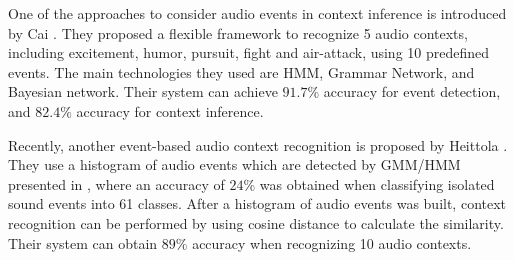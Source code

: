 One of the approaches to consider audio events in context inference is introduced by Cai \et\cite{1621215}. They proposed a flexible framework to recognize 5 audio contexts, including excitement, humor, pursuit, fight and air-attack, using 10 predefined events. The main technologies they used are HMM, Grammar Network, and Bayesian network. Their system can achieve $91.7\%$ accuracy for event detection, and $82.4\%$ accuracy for context inference.

Recently, another event-based audio context recognition is proposed by Heittola \et\cite{heittola2010audio}. They use a histogram of audio events which are detected by GMM/HMM presented in \cite{mesaros2010acoustic}, where an accuracy of $24\%$ was obtained when classifying isolated sound events into 61 classes. After a histogram of audio events was built, context recognition can be performed by using cosine distance to calculate the similarity. Their system can obtain $89\%$ accuracy when recognizing 10 audio contexts.

